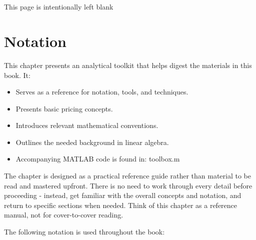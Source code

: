 \documentclass[
  letterpaper,
  DIV=11,
  numbers=noendperiod]{scrreprt}
\providecommand{\tightlist}{%
  \setlength{\itemsep}{0pt}\setlength{\parskip}{0pt}}
\begin{document}

\chapter{}\label{section}

This page is intentionally left blank


\chapter{Notation}\label{notation}

\begin{tcolorbox}[enhanced jigsaw, arc=.35mm, bottomrule=.15mm, breakable, colback=white, colframe=quarto-callout-color-frame, left=2mm, leftrule=.75mm, opacityback=0, rightrule=.15mm, toprule=.15mm]

This chapter presents an analytical toolkit that helps digest the
materials in this book. It:

\begin{itemize}
\tightlist
\item
  Serves as a reference for notation, tools, and techniques.
\item
  Presents basic pricing concepts.
\item
  Introduces relevant mathematical conventions.
\item
  Outlines the needed background in linear algebra.
\item
  Accompanying MATLAB code is found in: toolbox.m
\end{itemize}

\end{tcolorbox}

The chapter is designed as a practical reference guide rather than
material to be read and mastered upfront. There is no need to work
through every detail before proceeding - instead, get familiar with the
overall concepts and notation, and return to specific sections when
needed. Think of this chapter as a reference manual, not for
cover-to-cover reading.

The following notation is used throughout the book:
\end{document}
